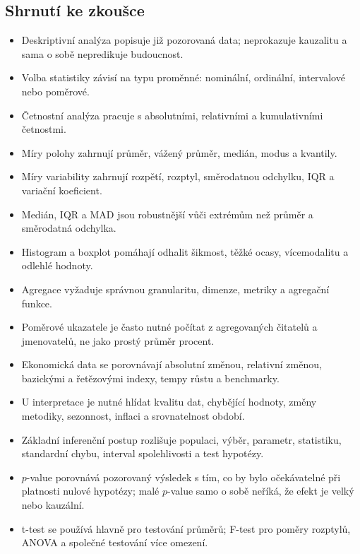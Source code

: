 \subsection{Shrnutí ke zkoušce}
\begin{itemize}
  \item Deskriptivní analýza popisuje již pozorovaná data; neprokazuje kauzalitu a sama o sobě
  nepredikuje budoucnost.
  \item Volba statistiky závisí na typu proměnné: nominální, ordinální, intervalové nebo poměrové.
  \item Četnostní analýza pracuje s absolutními, relativními a kumulativními četnostmi.
  \item Míry polohy zahrnují průměr, vážený průměr, medián, modus a kvantily.
  \item Míry variability zahrnují rozpětí, rozptyl, směrodatnou odchylku, IQR a variační koeficient.
  \item Medián, IQR a MAD jsou robustnější vůči extrémům než průměr a směrodatná odchylka.
  \item Histogram a boxplot pomáhají odhalit šikmost, těžké ocasy, vícemodalitu a odlehlé hodnoty.
  \item Agregace vyžaduje správnou granularitu, dimenze, metriky a agregační funkce.
  \item Poměrové ukazatele je často nutné počítat z agregovaných čitatelů a jmenovatelů, ne jako
  prostý průměr procent.
  \item Ekonomická data se porovnávají absolutní změnou, relativní změnou, bazickými a řetězovými
  indexy, tempy růstu a benchmarky.
  \item U interpretace je nutné hlídat kvalitu dat, chybějící hodnoty, změny metodiky, sezonnost,
  inflaci a srovnatelnost období.
  \item Základní inferenční postup rozlišuje populaci, výběr, parametr, statistiku, standardní chybu,
  interval spolehlivosti a test hypotézy.
  \item \(p\)-value porovnává pozorovaný výsledek s tím, co by bylo očekávatelné při platnosti nulové
  hypotézy; malé \(p\)-value samo o sobě neříká, že efekt je velký nebo kauzální.
  \item t-test se používá hlavně pro testování průměrů; F-test pro poměry rozptylů, ANOVA a společné
  testování více omezení.
\end{itemize}

